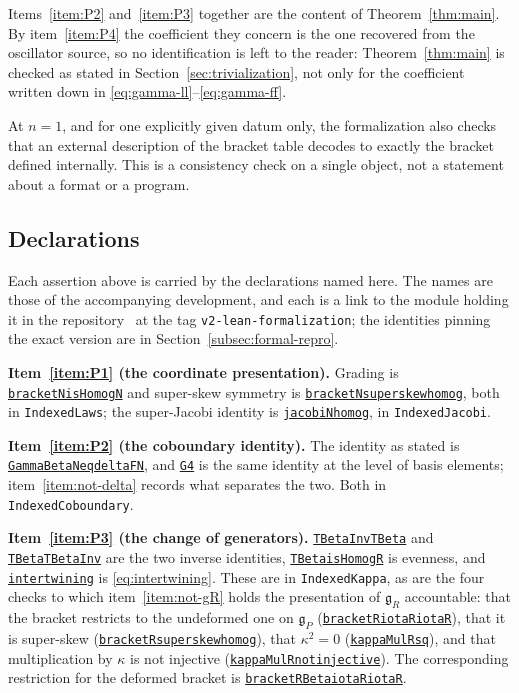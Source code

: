\documentclass[11pt]{article}
\numberwithin{equation}{section}
\newcommand{\leanus}{\textunderscore\allowbreak}
\newcommand{\leandecl}[2]{\href{https://github.com/ritsumei-aoi/osp-triviality/blob/v2-lean-formalization/InhomogeneousDeformations/#1.lean}{\texttt{\let\_\leanus #2}}}
\theoremstyle{remark}
\begin{document}
Items~\ref{item:P2} and~\ref{item:P3} together are the content of
Theorem~\ref{thm:main}. By item~\ref{item:P4} the coefficient they concern is the
one recovered from the oscillator source, so no identification is left to the
reader: Theorem~\ref{thm:main} is checked as stated in
Section~\ref{sec:trivialization}, not only for the coefficient written down in
\eqref{eq:gamma-ll}--\eqref{eq:gamma-ff}.

At $n=1$, and for one explicitly given datum only, the formalization also
checks that an external description of the bracket table decodes to exactly the
bracket defined internally. This is a consistency check on a single object, not a
statement about a format or a program.

\subsection{Declarations}\label{subsec:formal-binding}
\begingroup
\sloppy

Each assertion above is carried by the declarations named here. The names are
those of the accompanying development, and each is a link to the module holding
it in the repository~\cite{Repo} at the tag \texttt{v2-lean-formalization}; the
identities pinning the exact version are in Section~\ref{subsec:formal-repro}.

\textbf{Item~\ref{item:P1} (the coordinate presentation).} Grading is
\leandecl{IndexedLaws}{bracketN\_isHomogN} and super-skew symmetry is
\leandecl{IndexedLaws}{bracketN\_super\_skew\_homog}, both in
\texttt{IndexedLaws}; the super-Jacobi identity is
\leandecl{IndexedJacobi}{jacobiN\_homog}, in \texttt{IndexedJacobi}.

\textbf{Item~\ref{item:P2} (the coboundary identity).} The identity as stated is
\leandecl{IndexedCoboundary}{GammaBetaN\_eq\_deltaFN}, and
\leandecl{IndexedCoboundary}{G4} is the same identity at the level of basis
elements; item~\ref{item:not-delta} records what separates the two. Both in
\texttt{IndexedCoboundary}.

\textbf{Item~\ref{item:P3} (the change of generators).}
\leandecl{IndexedKappa}{TBetaInv\_TBeta} and
\leandecl{IndexedKappa}{TBeta\_TBetaInv} are the two inverse identities,
\leandecl{IndexedKappa}{TBeta\_isHomogR} is evenness, and
\leandecl{IndexedKappa}{intertwining} is \eqref{eq:intertwining}. These are in
\texttt{IndexedKappa}, as are the four checks to which item~\ref{item:not-gR}
holds the presentation of $\mathfrak g_R$ accountable: that the bracket
restricts to the undeformed one on $\mathfrak g_P$
(\leandecl{IndexedKappa}{bracketR\_iotaR\_iotaR}), that it is super-skew
(\leandecl{IndexedKappa}{bracketR\_super\_skew\_homog}), that $\kappa^2=0$
(\leandecl{IndexedKappa}{kappaMulR\_sq}), and that multiplication by $\kappa$
is not injective (\leandecl{IndexedKappa}{kappaMulR\_not\_injective}).
The corresponding restriction for the deformed bracket is
\leandecl{IndexedKappa}{bracketRBeta\_iotaR\_iotaR}.
\end{document}
